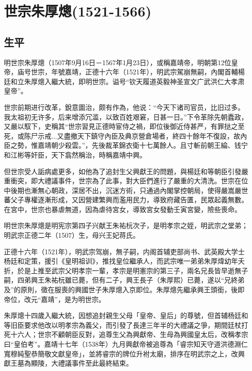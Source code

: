 
\section{世宗朱厚熜\tiny(1521-1566)}

\subsection{生平}

明世宗朱厚熜（1507年9月16日－1567年1月23日），或稱嘉靖帝，明朝第12位皇帝，庙号世宗，年號嘉靖，正德十六年（1521年），明武宗駕崩無嗣，內閣首輔楊廷和立朱厚熜入繼大統，即明世宗。谥号“钦天履道英毅神圣宣文广武洪仁大孝肃皇帝”。

世宗前期进行改革，銳意圖治，颇有作為，他说：“今天下诸司官员，比旧过多。我太祖初无许多，后来增添冗滥，以致百姓艰窘，日甚一日。”下令革除先朝蠹政，又嚴以馭下，史稱其“世宗習見正德時宦侍之禍，即位後御近侍甚严，有罪挞之至死，或陈尸示戒...又盡撤天下鎮守內臣及典京營倉場者，終四十餘年不復設，故內臣之勢，惟嘉靖朝少殺雲。”，先後裁革錦衣衛十七萬餘人。且寸斬前朝王綸、钱宁和江彬等奸臣，天下翕然稱治，時稱嘉靖中興。

但世宗受人詬病處更多，如他為了追封生父興獻王的問題，與楊廷和等朝臣引發嚴重衝突，即大禮議事件，世宗為了此事，對大臣們進行了嚴重的大清洗。世宗在位中後期也漸無心朝政，深居不出，沉迷方術，只通過內閣掌控朝局，使得嚴嵩嚴世蕃父子專權逐漸形成，又因營建繁興而濫用民力，導致府藏告匱，民眾起義無數。在宮中，世宗也暴虐無道，因為虐待宮女，導致宮女發動壬寅宮變，險些喪命。

明世宗朱厚熜是明宪宗第四子兴献王朱祐杬次子，是明孝宗之姪，明武宗之堂弟；明武宗正德二年（1507）生，母兴王妃蒋氏。

正德十六年（1521年），明武宗驾崩，無子嗣，内阁首辅吏部尚书、武英殿大学士杨廷和定策，援引《皇明祖训》，推找皇位繼承人，而武宗唯一弟弟朱厚煒幼年夭折，於是上推至武宗父明孝宗一輩，孝宗是明憲宗的第三子，兩名兄長皆早逝無子嗣，四弟興王朱祐杬雖已薨，但有二子，興王長子（朱厚熙）已薨，遂以“兄終弟及”的原則，徵在服喪的興國世子朱厚熜入京即位。朱厚熜先繼承興王頭銜，後即帝位，改元“嘉靖”，是为明世宗。

朱厚熜十四歲入繼大統，因想追封親生父母「皇帝、皇后」的尊號，但首辅杨廷和等旧臣要求他改以明孝宗為義父，而引發了長達三年半的大禮議之爭，期間廷杖打死十六人；世宗不顧朝臣反對，追尊生父為興獻帝、生母為興國皇太后，改稱孝宗曰“皇伯考”。嘉靖十七年（1538年）九月興獻帝被追尊為「睿宗知天守道洪德淵仁寬穆純聖恭簡敬文獻皇帝」，並將睿宗的牌位升袝太廟，排序在明武宗之上，改興獻王墓為顯陵，大禮議事件至此最終結束。

